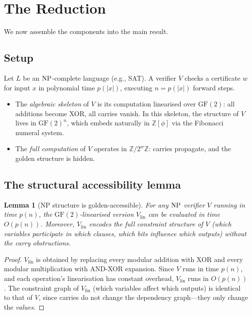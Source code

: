 \documentclass[12pt, a4paper]{article}
\theoremstyle{plain}
\newtheorem{lemma}[theorem]{Lemma}
\theoremstyle{definition}
\theoremstyle{remark}
\newcommand{\Z}{\mathbb{Z}}
\newcommand{\GF}{\mathrm{GF}}
\newcommand{\NP}{\textup{NP}}
\newcommand{\Zphi}{\Z[\phi]}
\begin{document}
\section{The Reduction}
\label{sec:reduction}

We now assemble the components into the main result.

\subsection{Setup}

Let $L$ be an $\NP$-complete language (e.g., SAT).  A verifier $V$
checks a certificate $w$ for input $x$ in polynomial time
$p(|x|)$, executing $n = p(|x|)$ forward steps.

\begin{itemize}[nosep]
  \item The \emph{algebraic skeleton} of $V$ is its computation
        linearised over $\GF(2)$: all additions become XOR, all
        carries vanish.  In this skeleton, the structure of $V$ lives
        in $\GF(2)^n$, which embeds naturally in $\Zphi$ via the
        Fibonacci numeral system.
  \item The \emph{full computation} of $V$ operates in $\Z/2^w\Z$:
        carries propagate, and the golden structure is hidden.
\end{itemize}

\subsection{The structural accessibility lemma}

\begin{lemma}[NP structure is golden-accessible]
\label{lem:golden-access}
For any $\NP$ verifier $V$ running in time $p(n)$, the $\GF(2)$-linearised
version $V_{\text{lin}}$ can be evaluated in time $O(p(n))$.
Moreover, $V_{\text{lin}}$ encodes the full constraint structure of
$V$ (which variables participate in which clauses, which bits
influence which outputs) without the carry obstructions.
\end{lemma}

\begin{proof}
$V_{\text{lin}}$ is obtained by replacing every modular addition with
XOR and every modular multiplication with AND-XOR expansion.  Since
$V$ runs in time $p(n)$, and each operation's linearisation has
constant overhead, $V_{\text{lin}}$ runs in $O(p(n))$.  The constraint
graph of $V_{\text{lin}}$ (which variables affect which outputs) is
identical to that of $V$, since carries do not change the dependency
graph---they only change the \emph{values}.
\end{proof}
\end{document}
